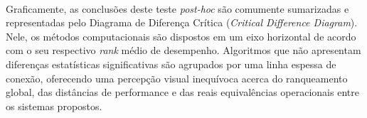 \paragraph{} Graficamente, as conclusões deste teste \textit{post-hoc} são comumente sumarizadas e representadas pelo Diagrama de Diferença Crítica (\textit{Critical Difference Diagram}). Nele, os métodos computacionais são dispostos em um eixo horizontal de acordo com o seu respectivo \textit{rank} médio de desempenho. Algoritmos que não apresentam diferenças estatísticas significativas são agrupados por uma linha espessa de conexão, oferecendo uma percepção visual inequívoca acerca do ranqueamento global, das distâncias de performance e das reais equivalências operacionais entre os sistemas propostos.